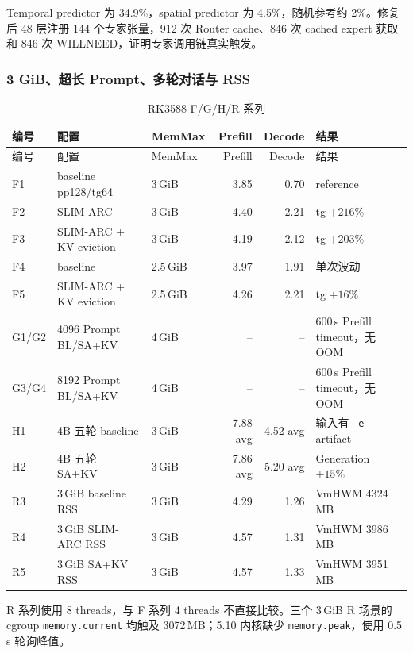 Temporal predictor 为 34.9\%，spatial predictor 为 4.5\%，随机参考约 2\%。修复后 48 层注册 144 个专家张量，912 次 Router cache、846 次 cached expert 获取和 846 次 WILLNEED，证明专家调用链真实触发。

\subsubsection{3 GiB、超长 Prompt、多轮对话与 RSS}

\begin{longtable}{p{}p{}p{}rrp{}}
  \caption{RK3588 F/G/H/R 系列}\label{tab:appendix-rk-fgh}\\
  \toprule
  编号 & 配置 & MemMax & Prefill & Decode & 结果 \\
  \midrule
  \endfirsthead
  \toprule 编号 & 配置 & MemMax & Prefill & Decode & 结果 \\
  \midrule
  \endhead
  F1 & baseline pp128/tg64 & 3\,GiB & 3.85 & 0.70 & reference \\
  F2 & SLIM-ARC & 3\,GiB & 4.40 & 2.21 & tg $+216\%$ \\
  F3 & SLIM-ARC + KV eviction & 3\,GiB & 4.19 & 2.12 & tg $+203\%$ \\
  F4 & baseline & 2.5\,GiB & 3.97 & 1.91 & 单次波动 \\
  F5 & SLIM-ARC + KV eviction & 2.5\,GiB & 4.26 & 2.21 & tg $+16\%$ \\
  G1/G2 & 4096 Prompt BL/SA+KV & 4\,GiB & -- & -- & 600\,s Prefill timeout，无 OOM \\
  G3/G4 & 8192 Prompt BL/SA+KV & 4\,GiB & -- & -- & 600\,s Prefill timeout，无 OOM \\
  H1 & 4B 五轮 baseline & 3\,GiB & 7.88 avg & 4.52 avg & 输入有 \texttt{-e} artifact \\
  H2 & 4B 五轮 SA+KV & 3\,GiB & 7.86 avg & 5.20 avg & Generation $+15\%$ \\
  R3 & 3\,GiB baseline RSS & 3\,GiB & 4.29 & 1.26 & VmHWM 4324\,MB \\
  R4 & 3\,GiB SLIM-ARC RSS & 3\,GiB & 4.57 & 1.31 & VmHWM 3986\,MB \\
  R5 & 3\,GiB SA+KV RSS & 3\,GiB & 4.57 & 1.33 & VmHWM 3951\,MB \\
  \bottomrule
\end{longtable}

R 系列使用 8 threads，与 F 系列 4 threads 不直接比较。三个 3\,GiB R 场景的 cgroup \texttt{memory.current} 均触及 3072\,MB；5.10 内核缺少 \texttt{memory.peak}，使用 0.5\,s 轮询峰值。

